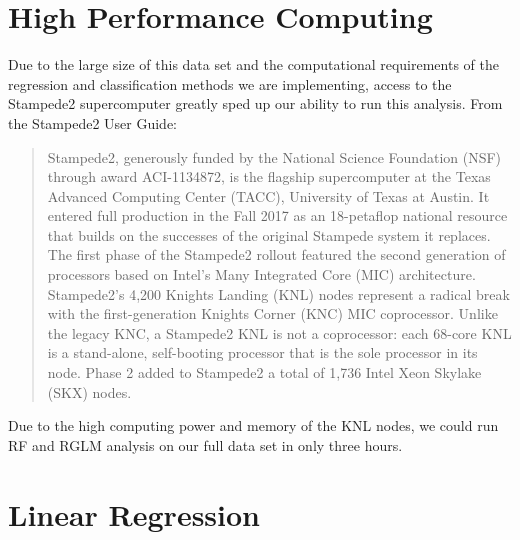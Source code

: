 \documentclass[12 pt]{uncw_thesis}
\theoremstyle{plain}
\theoremstyle{remark}
\theoremstyle{definition}
\begin{document}
\section{High Performance Computing}
Due to the large size of this data set and the computational requirements of the regression and classification methods we are implementing, access to the Stampede2 supercomputer greatly sped up our ability to run this analysis. From the Stampede2 User Guide:
\begin{quotation}
	Stampede2, generously funded by the National Science Foundation (NSF) through award ACI-1134872, is the flagship supercomputer at the Texas Advanced Computing Center (TACC), University of Texas at Austin. It entered full production in the Fall 2017 as an 18-petaflop national resource that builds on the successes of the original Stampede system it replaces. The first phase of the Stampede2 rollout featured the second generation of processors based on Intel's Many Integrated Core (MIC) architecture. Stampede2's 4,200 Knights Landing (KNL) nodes represent a radical break with the first-generation Knights Corner (KNC) MIC coprocessor. Unlike the legacy KNC, a Stampede2 KNL is not a coprocessor: each 68-core KNL is a stand-alone, self-booting processor that is the sole processor in its node. Phase 2 added to Stampede2 a total of 1,736 Intel Xeon Skylake (SKX) nodes.\cite{Stampede}
\end{quotation}
Due to the high computing power and memory of the KNL nodes, we could run RF and RGLM analysis on our full data set in only three hours.  
\section{Linear Regression}
\end{document}
